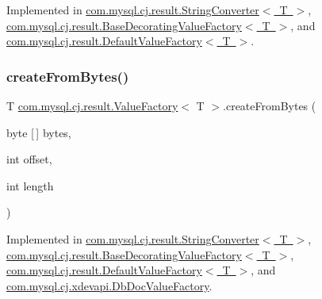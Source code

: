Implemented in \mbox{\hyperlink{classcom_1_1mysql_1_1cj_1_1result_1_1_string_converter_a328be706c2bb9de113338b42cb20d8c6}{com.\+mysql.\+cj.\+result.\+String\+Converter$<$ T $>$}}, \mbox{\hyperlink{classcom_1_1mysql_1_1cj_1_1result_1_1_base_decorating_value_factory_ae424a4142df77302b0cc712d8d6b38be}{com.\+mysql.\+cj.\+result.\+Base\+Decorating\+Value\+Factory$<$ T $>$}}, and \mbox{\hyperlink{classcom_1_1mysql_1_1cj_1_1result_1_1_default_value_factory_a05b8ff2d9d1c7ff5c6f5b26188a5476c}{com.\+mysql.\+cj.\+result.\+Default\+Value\+Factory$<$ T $>$}}.

\mbox{\label{interfacecom_1_1mysql_1_1cj_1_1result_1_1_value_factory_a0724fcd13ef1ef07c781a61167847a11}} 
\subsubsection{\texorpdfstring{create\+From\+Bytes()}{createFromBytes()}}
{\footnotesize\ttfamily T \mbox{\hyperlink{interfacecom_1_1mysql_1_1cj_1_1result_1_1_value_factory}{com.\+mysql.\+cj.\+result.\+Value\+Factory}}$<$ T $>$.create\+From\+Bytes (\begin{DoxyParamCaption}\item[{byte \mbox{[}$\,$\mbox{]}}]{bytes,  }\item[{int}]{offset,  }\item[{int}]{length }\end{DoxyParamCaption})}



Implemented in \mbox{\hyperlink{classcom_1_1mysql_1_1cj_1_1result_1_1_string_converter_a62092d8d4f0919ee0c63e7b4caf29d5a}{com.\+mysql.\+cj.\+result.\+String\+Converter$<$ T $>$}}, \mbox{\hyperlink{classcom_1_1mysql_1_1cj_1_1result_1_1_base_decorating_value_factory_a36b451b3b030ef65417756206968626e}{com.\+mysql.\+cj.\+result.\+Base\+Decorating\+Value\+Factory$<$ T $>$}}, \mbox{\hyperlink{classcom_1_1mysql_1_1cj_1_1result_1_1_default_value_factory_a97d2423b59241620b2e0a519c54b592a}{com.\+mysql.\+cj.\+result.\+Default\+Value\+Factory$<$ T $>$}}, and \mbox{\hyperlink{classcom_1_1mysql_1_1cj_1_1xdevapi_1_1_db_doc_value_factory_a9c915537c139a6430520b8a0b92d461e}{com.\+mysql.\+cj.\+xdevapi.\+Db\+Doc\+Value\+Factory}}.

